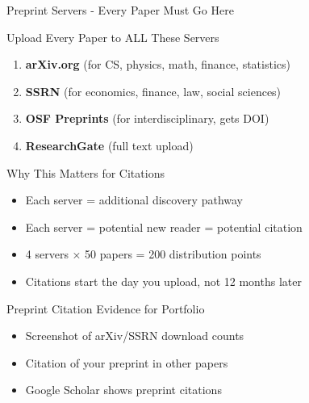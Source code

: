 \documentclass[11pt]{beamer}
\begin{document}
	\begin{frame}{Preprint Servers - Every Paper Must Go Here}
		\scriptsize
		\begin{block}{Upload Every Paper to ALL These Servers}
			\begin{enumerate}
				\item \textbf{arXiv.org} (for CS, physics, math, finance, statistics)
				\item \textbf{SSRN} (for economics, finance, law, social sciences)
				\item \textbf{OSF Preprints} (for interdisciplinary, gets DOI)
				\item \textbf{ResearchGate} (full text upload)
			\end{enumerate}
		\end{block}
		\begin{block}{Why This Matters for Citations}
			\begin{itemize}
				\item Each server = additional discovery pathway
				\item Each server = potential new reader = potential citation
				\item 4 servers × 50 papers = 200 distribution points
				\item Citations start the day you upload, not 12 months later
			\end{itemize}
		\end{block}
		\begin{block}{Preprint Citation Evidence for Portfolio}
			\begin{itemize}
				\item Screenshot of arXiv/SSRN download counts
				\item Citation of your preprint in other papers
				\item Google Scholar shows preprint citations
			\end{itemize}
		\end{block}
	\end{frame}
	
\end{document}

